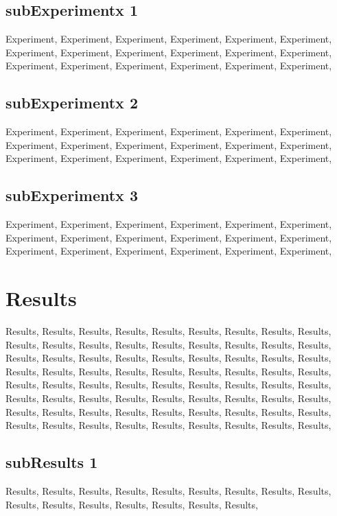 \documentclass[a4paper]{article}
\begin{document}
\subsection{subExperimentx 1}
Experiment, Experiment, Experiment, Experiment, Experiment, Experiment, Experiment, Experiment, Experiment, Experiment, Experiment, Experiment, Experiment, Experiment, Experiment, Experiment, Experiment, Experiment,

\subsection{subExperimentx 2}
Experiment, Experiment, Experiment, Experiment, Experiment, Experiment, Experiment, Experiment, Experiment, Experiment, Experiment, Experiment, Experiment, Experiment, Experiment, Experiment, Experiment, Experiment,

\subsection{subExperimentx 3}
Experiment, Experiment, Experiment, Experiment, Experiment, Experiment, Experiment, Experiment, Experiment, Experiment, Experiment, Experiment, Experiment, Experiment, Experiment, Experiment, Experiment, Experiment,


\section{Results} %
\label{Results}
Results, Results, Results, Results, Results, Results, Results, Results, Results, Results, Results, Results, Results, Results, Results, Results, Results, Results, Results, Results, Results, Results, Results, Results, Results, Results, Results, Results, Results, Results, Results, Results, Results, Results, Results, Results, Results, Results, Results, Results, Results, Results, Results, Results, Results, Results, Results, Results, Results, Results, Results, Results, Results, Results, Results, Results, Results, Results, Results, Results, Results, Results, Results, Results, Results, Results, Results, Results, Results, Results, Results, Results, 

\subsection{subResults 1}
Results, Results, Results, Results, Results, Results, Results, Results, Results, Results, Results, Results, Results, Results, Results, Results,
\end{document}

